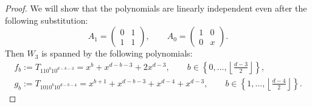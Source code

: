 \documentclass[pdftex]{sigma}
\numberwithin{equation}{section}
\begin{document}
\begin{proof}
We will show that the polynomials are linearly independent even after the following substitution:
\[
A_1=
\begin{pmatrix}
0 & 1 \\
1 & 1
\end{pmatrix}, \qquad
A_0=
\begin{pmatrix}
1 & 0 \\
0 & x
\end{pmatrix}.
\]
Then $W_3$ is spanned by the following polynomials:
\begin{gather*}
f_b := T_{110^b10^{d-b-3}}=x^{b}+x^{d-b-3} + 2x^{d-3}, \qquad b\in\left\{0,\dots,\left\lfloor \frac{d-3}{2}\right\rfloor\right\},\\
g_b := T_{1010^b10^{d-b-4}}=x^{b+1}+x^{d-b-3}+ x^{d-4} +x^{d-3},  \qquad b\in \left\{1,\dots,\left\lfloor \frac{d-4}{2}\right\rfloor\right\}.
\end{gather*}


\end{proof}
\end{document}
